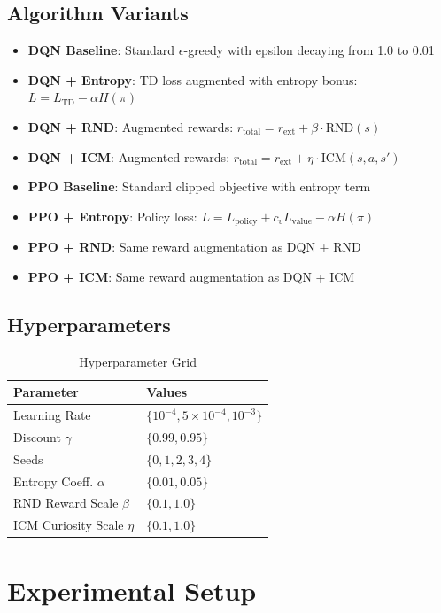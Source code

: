 \documentclass[conference]{IEEEtran}
\begin{document}
\subsection{Algorithm Variants}
\begin{itemize}
  \item \textbf{DQN Baseline}: Standard $\epsilon$-greedy with epsilon decaying from 1.0 to 0.01
  \item \textbf{DQN + Entropy}: TD loss augmented with entropy bonus: $L = L_{\text{TD}} - \alpha H(\pi)$
  \item \textbf{DQN + RND}: Augmented rewards: $r_{\text{total}} = r_{\text{ext}} + \beta \cdot \text{RND}(s)$
  \item \textbf{DQN + ICM}: Augmented rewards: $r_{\text{total}} = r_{\text{ext}} + \eta \cdot \text{ICM}(s, a, s')$
  \item \textbf{PPO Baseline}: Standard clipped objective with entropy term
  \item \textbf{PPO + Entropy}: Policy loss: $L = L_{\text{policy}} + c_v L_{\text{value}} - \alpha H(\pi)$
  \item \textbf{PPO + RND}: Same reward augmentation as DQN + RND
  \item \textbf{PPO + ICM}: Same reward augmentation as DQN + ICM
\end{itemize}

\subsection{Hyperparameters}
\begin{table}[H]
  \centering
  \caption{Hyperparameter Grid}
  \begin{tabular}{ll}
    \toprule
    \textbf{Parameter} & \textbf{Values} \\
    \midrule
    Learning Rate & $\{10^{-4}, 5 \times 10^{-4}, 10^{-3}\}$ \\
    Discount $\gamma$ & $\{0.99, 0.95\}$ \\
    Seeds & $\{0, 1, 2, 3, 4\}$ \\
    Entropy Coeff. $\alpha$ & $\{0.01, 0.05\}$ \\
    RND Reward Scale $\beta$ & $\{0.1, 1.0\}$ \\
    ICM Curiosity Scale $\eta$ & $\{0.1, 1.0\}$ \\
    \bottomrule
  \end{tabular}
\end{table}

\section{Experimental Setup}
\end{document}
